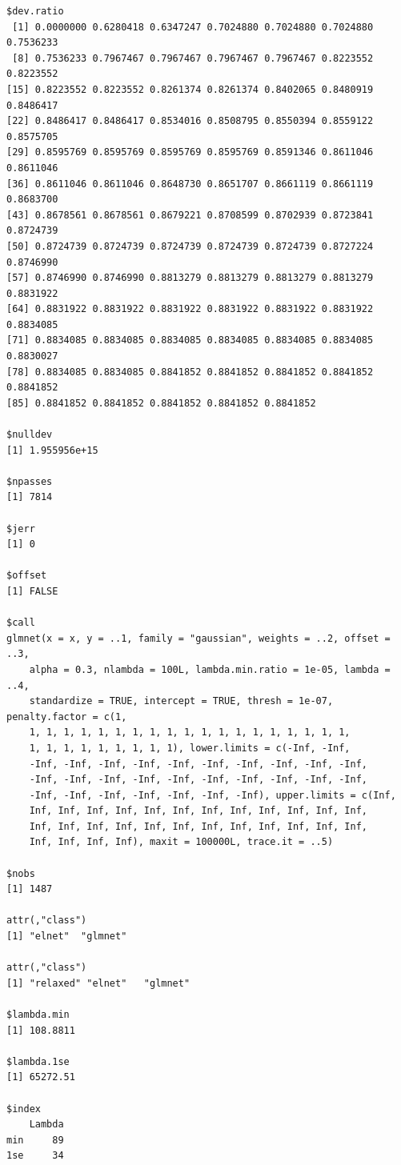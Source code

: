 \documentclass[
]{article}
\begin{document}
\begin{verbatim}
$dev.ratio
 [1] 0.0000000 0.6280418 0.6347247 0.7024880 0.7024880 0.7024880 0.7536233
 [8] 0.7536233 0.7967467 0.7967467 0.7967467 0.7967467 0.8223552 0.8223552
[15] 0.8223552 0.8223552 0.8261374 0.8261374 0.8402065 0.8480919 0.8486417
[22] 0.8486417 0.8486417 0.8534016 0.8508795 0.8550394 0.8559122 0.8575705
[29] 0.8595769 0.8595769 0.8595769 0.8595769 0.8591346 0.8611046 0.8611046
[36] 0.8611046 0.8611046 0.8648730 0.8651707 0.8661119 0.8661119 0.8683700
[43] 0.8678561 0.8678561 0.8679221 0.8708599 0.8702939 0.8723841 0.8724739
[50] 0.8724739 0.8724739 0.8724739 0.8724739 0.8724739 0.8727224 0.8746990
[57] 0.8746990 0.8746990 0.8813279 0.8813279 0.8813279 0.8813279 0.8831922
[64] 0.8831922 0.8831922 0.8831922 0.8831922 0.8831922 0.8831922 0.8834085
[71] 0.8834085 0.8834085 0.8834085 0.8834085 0.8834085 0.8834085 0.8830027
[78] 0.8834085 0.8834085 0.8841852 0.8841852 0.8841852 0.8841852 0.8841852
[85] 0.8841852 0.8841852 0.8841852 0.8841852 0.8841852

$nulldev
[1] 1.955956e+15

$npasses
[1] 7814

$jerr
[1] 0

$offset
[1] FALSE

$call
glmnet(x = x, y = ..1, family = "gaussian", weights = ..2, offset = ..3, 
    alpha = 0.3, nlambda = 100L, lambda.min.ratio = 1e-05, lambda = ..4, 
    standardize = TRUE, intercept = TRUE, thresh = 1e-07, penalty.factor = c(1, 
    1, 1, 1, 1, 1, 1, 1, 1, 1, 1, 1, 1, 1, 1, 1, 1, 1, 1, 1, 
    1, 1, 1, 1, 1, 1, 1, 1, 1), lower.limits = c(-Inf, -Inf, 
    -Inf, -Inf, -Inf, -Inf, -Inf, -Inf, -Inf, -Inf, -Inf, -Inf, 
    -Inf, -Inf, -Inf, -Inf, -Inf, -Inf, -Inf, -Inf, -Inf, -Inf, 
    -Inf, -Inf, -Inf, -Inf, -Inf, -Inf, -Inf), upper.limits = c(Inf, 
    Inf, Inf, Inf, Inf, Inf, Inf, Inf, Inf, Inf, Inf, Inf, Inf, 
    Inf, Inf, Inf, Inf, Inf, Inf, Inf, Inf, Inf, Inf, Inf, Inf, 
    Inf, Inf, Inf, Inf), maxit = 100000L, trace.it = ..5)

$nobs
[1] 1487

attr(,"class")
[1] "elnet"  "glmnet"

attr(,"class")
[1] "relaxed" "elnet"   "glmnet" 

$lambda.min
[1] 108.8811

$lambda.1se
[1] 65272.51

$index
    Lambda
min     89
1se     34


\end{verbatim}
\end{document}
